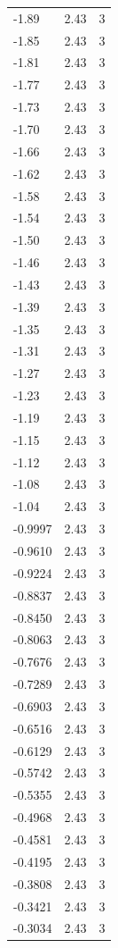 \begin{longtable}{lrr}
  -1.89 & 2.43 & 3 \\
  -1.85 & 2.43 & 3 \\
  -1.81 & 2.43 & 3 \\
  -1.77 & 2.43 & 3 \\
  -1.73 & 2.43 & 3 \\
  -1.70 & 2.43 & 3 \\
  -1.66 & 2.43 & 3 \\
  -1.62 & 2.43 & 3 \\
  -1.58 & 2.43 & 3 \\
  -1.54 & 2.43 & 3 \\
  -1.50 & 2.43 & 3 \\
  -1.46 & 2.43 & 3 \\
  -1.43 & 2.43 & 3 \\
  -1.39 & 2.43 & 3 \\
  -1.35 & 2.43 & 3 \\
  -1.31 & 2.43 & 3 \\
  -1.27 & 2.43 & 3 \\
  -1.23 & 2.43 & 3 \\
  -1.19 & 2.43 & 3 \\
  -1.15 & 2.43 & 3 \\
  -1.12 & 2.43 & 3 \\
  -1.08 & 2.43 & 3 \\
  -1.04 & 2.43 & 3 \\
  -0.9997 & 2.43 & 3 \\
  -0.9610 & 2.43 & 3 \\
  -0.9224 & 2.43 & 3 \\
  -0.8837 & 2.43 & 3 \\
  -0.8450 & 2.43 & 3 \\
  -0.8063 & 2.43 & 3 \\
  -0.7676 & 2.43 & 3 \\
  -0.7289 & 2.43 & 3 \\
  -0.6903 & 2.43 & 3 \\
  -0.6516 & 2.43 & 3 \\
  -0.6129 & 2.43 & 3 \\
  -0.5742 & 2.43 & 3 \\
  -0.5355 & 2.43 & 3 \\
  -0.4968 & 2.43 & 3 \\
  -0.4581 & 2.43 & 3 \\
  -0.4195 & 2.43 & 3 \\
  -0.3808 & 2.43 & 3 \\
  -0.3421 & 2.43 & 3 \\
  -0.3034 & 2.43 & 3 \\

\end{longtable}
